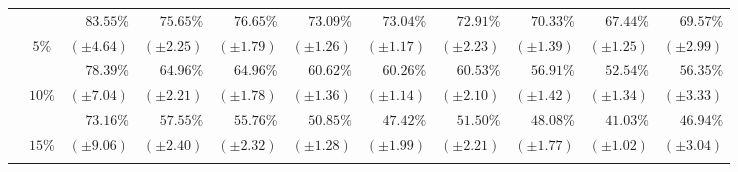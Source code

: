 \begin{table}[!htb]
\begin{center}
{\begin{tabular}{|c|c|r|r|r|r|r|r|r|r|r|}
						\cellcolor{colorTableHeader!15}
							& \cellcolor{colorTableHeader!15}
							& $83.55$\%
							& $75.65$\%
							& $76.65$\%
							& $73.09$\%
							& $73.04$\%
							& $72.91$\%
							& $70.33$\%
							& $67.44$\%
							& $69.57$\%
							\tabularnewline
						\cellcolor{colorTableHeader!15}
							& \multirow{-2}{*}{
								\cellcolor{colorTableHeader!15}
								$5$\%
							}
							& \footnotesize $(\pm4.64)$
							& \footnotesize $(\pm2.25)$
							& \footnotesize $(\pm1.79)$
							& \footnotesize $(\pm1.26)$
							& \footnotesize $(\pm1.17)$
							& \footnotesize $(\pm2.23)$
							& \footnotesize $(\pm1.39)$
							& \footnotesize $(\pm1.25)$
							& \footnotesize $(\pm2.99)$
							\tabularnewline
							\hhline{~----------}
						
						\cellcolor{colorTableHeader!15}
							& \cellcolor{colorTableHeader!15}
							& $78.39$\%
							& $64.96$\%
							& $64.96$\%
							& $60.62$\%
							& $60.26$\%
							& $60.53$\%
							& $56.91$\%
							& $52.54$\%
							& $56.35$\%
							\tabularnewline
						\cellcolor{colorTableHeader!15}
							& \multirow{-2}{*}{
								\cellcolor{colorTableHeader!15}
								$10$\%
							}
							& \footnotesize $(\pm7.04)$
							& \footnotesize $(\pm2.21)$
							& \footnotesize $(\pm1.78)$
							& \footnotesize $(\pm1.36)$
							& \footnotesize $(\pm1.14)$
							& \footnotesize $(\pm2.10)$
							& \footnotesize $(\pm1.42)$
							& \footnotesize $(\pm1.34)$
							& \footnotesize $(\pm3.33)$
							\tabularnewline
							\hhline{~----------}
						
						\cellcolor{colorTableHeader!15}
							& \cellcolor{colorTableHeader!15}
							& $73.16$\%
							& $57.55$\%
							& $55.76$\%
							& $50.85$\%
							& $47.42$\%
							& $51.50$\%
							& $48.08$\%
							& $41.03$\%
							& $46.94$\%
							\tabularnewline
						\cellcolor{colorTableHeader!15}
							& \multirow{-2}{*}{
								\cellcolor{colorTableHeader!15}
								$15$\%
							}
							& \footnotesize $(\pm9.06)$
							& \footnotesize $(\pm2.40)$
							& \footnotesize $(\pm2.32)$
							& \footnotesize $(\pm1.28)$
							& \footnotesize $(\pm1.99)$
							& \footnotesize $(\pm2.21)$
							& \footnotesize $(\pm1.77)$
							& \footnotesize $(\pm1.02)$
							& \footnotesize $(\pm3.04)$
							\tabularnewline
							\hhline{~----------}
						

\end{tabular}}
\end{center}
\end{table}
